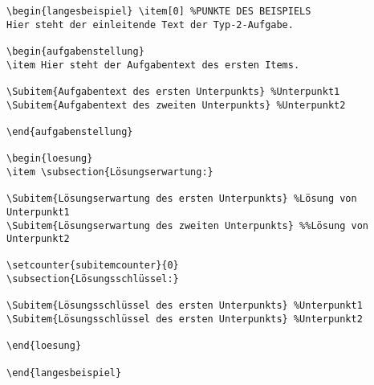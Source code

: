 \documentclass[a4paper,12pt]{article}
\begin{document}
\begin{verbatim}
\begin{langesbeispiel} \item[0] %PUNKTE DES BEISPIELS
Hier steht der einleitende Text der Typ-2-Aufgabe.

\begin{aufgabenstellung}
\item Hier steht der Aufgabentext des ersten Items.

\Subitem{Aufgabentext des ersten Unterpunkts} %Unterpunkt1
\Subitem{Aufgabentext des zweiten Unterpunkts} %Unterpunkt2

\end{aufgabenstellung}

\begin{loesung}
\item \subsection{Lösungserwartung:} 

\Subitem{Lösungserwartung des ersten Unterpunkts} %Lösung von Unterpunkt1
\Subitem{Lösungserwartung des zweiten Unterpunkts} %%Lösung von Unterpunkt2

\setcounter{subitemcounter}{0}
\subsection{Lösungsschlüssel:}
 
\Subitem{Lösungsschlüssel des ersten Unterpunkts} %Unterpunkt1
\Subitem{Lösungsschlüssel des ersten Unterpunkts} %Unterpunkt2

\end{loesung}

\end{langesbeispiel}
\end{verbatim}
\newpage
\end{document}
